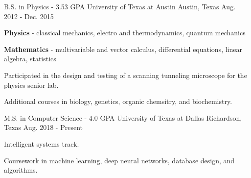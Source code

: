 

\begin{cventries}

  \cventry
    {B.S. in Physics - 3.53 GPA} %
    {University of Texas at Austin} %
    {Austin, Texas} %
    {Aug. 2012 - Dec. 2015} %
    {
      \begin{cvitems} %
        \item {
			\textbf{Physics} - classical mechanics, electro and
			thermodynamics, quantum mechanics
		}
        \item {
			\textbf{Mathematics} - multivariable and vector
			calculus,
			differential equations, linear algebra,
			statistics
		}
        \item {
			Participated in the design and testing of a scanning
			tunneling microscope for the physics senior lab.
		}
        \item {
			Additional courses in biology, genetics, organic
			chemsitry, and biochemistry.
		}
      \end{cvitems}
    }

  \cventry
    {M.S. in Computer Science - 4.0 GPA} %
    {University of Texas at Dallas} %
    {Richardson, Texas} %
    {Aug. 2018 - Present} %
    {
      \begin{cvitems} %
        \item {Intelligent systems track.}
        \item {
			Coursework in machine learning, deep neural networks,
			database design, and algorithms.
		}
      \end{cvitems}
    }

\end{cventries}

